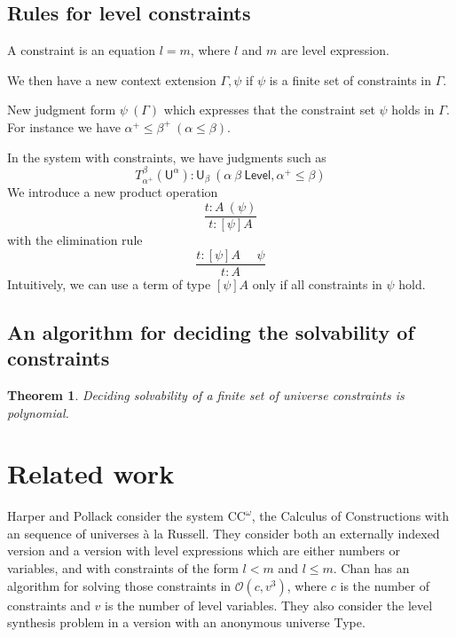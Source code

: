 \documentclass[11pt,a4paper]{article}
\newtheorem{theorem}{Theorem}[section]
\def\UU{\mathsf{U}}
\def\Level{\mathsf{Level}}
\def\Constraint{\mathsf{Constraint}}
\def\Ordo{\mathcal{O}}
\def\CComega{\mathrm{CC}^\omega}
\begin{document}
\subsection{Rules for level constraints}%

A constraint is an equation $l = m$, where $l$ and $m$ are level expression. 

We then have a new context extension $\Gamma,\psi$ if $\psi$ is a finite set of constraints in $\Gamma$.

New judgment form $\psi~(\Gamma)$ which expresses that the constraint set $\psi$
holds in $\Gamma$. For instance we have $\alpha^+\leqslant\beta^+~(\alpha\leqslant\beta)$.

In the system with constraints, we have judgments such as
$$
T_{\alpha^+}^{\beta}(\UU^{\alpha}):\UU_{\beta}~(\alpha~\beta~\Level,\alpha^+\leqslant\beta)
$$
We introduce a new product operation
$$
\frac{t:A~(\psi)}{t:[\psi]A}
$$
with the elimination rule
$$
\frac{t:[\psi]A~~~~~~\psi}{t:A}
$$
Intuitively, we can use a term of type $[\psi]A$ only if all constraints in $\psi$ hold.

\subsection{An algorithm for deciding the solvability of constraints}


\begin{theorem}\label{thm:P-solvability}
Deciding solvability of a finite set of universe constraints is polynomial.
\end{theorem}


\section{Related work}

Harper and Pollack \cite{HarperP91} consider the system $\CComega$, the Calculus of Constructions with an sequence of universes \`a la Russell. They consider both an externally indexed version and a version with level expressions which are either numbers or variables, and with constraints of the form $l < m$ and $l \leq m$. Chan has an algorithm for solving those constraints in $\Ordo(c,v^3)$, where $c$ is the number of constraints and $v$ is the number of level variables. They also consider the level synthesis problem in a version with an anonymous universe Type.
\end{document}
